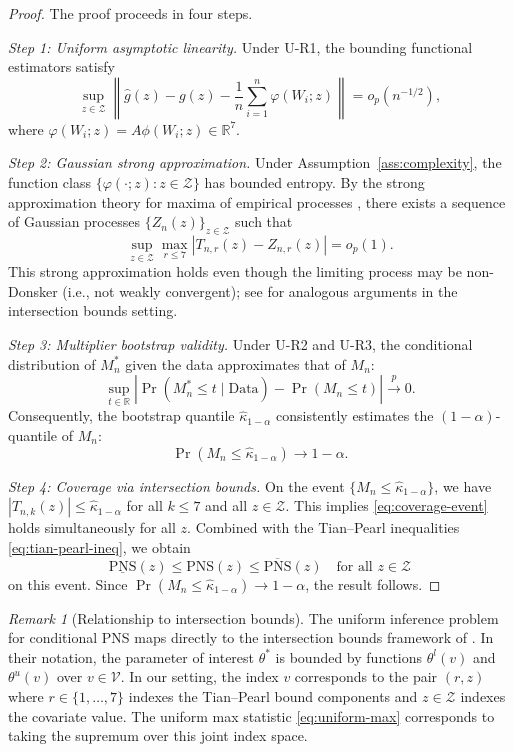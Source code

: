 \documentclass[accepted]{uai2026} %
\theoremstyle{plain}
\theoremstyle{definition}
\theoremstyle{remark}
\newtheorem{remark}[theorem]{Remark}
\begin{document}
\begin{proof}
The proof proceeds in four steps.

\emph{Step 1: Uniform asymptotic linearity.}
Under U-R1, the bounding functional estimators satisfy
\[
  \sup_{z \in \mathcal{Z}} \left\|
    \hat g(z) - g(z) - \frac{1}{n}\sum_{i=1}^n \varphi(W_i;z)
  \right\| = o_p(n^{-1/2}),
\]
where $\varphi(W_i;z) = A\phi(W_i;z) \in \mathbb{R}^7$.

\emph{Step 2: Gaussian strong approximation.}
Under Assumption~\ref{ass:complexity}, the function class
$\{\varphi(\cdot;z) : z \in \mathcal{Z}\}$ has bounded entropy. By the
strong approximation theory for maxima of empirical processes
\citep{chernozhukov2013gaussian}, there exists a sequence of Gaussian
processes $\{Z_n(z)\}_{z \in \mathcal{Z}}$ such that
\[
  \sup_{z \in \mathcal{Z}} \max_{r \le 7}
    \left| T_{n,r}(z) - Z_{n,r}(z) \right| = o_p(1).
\]
This strong approximation holds even though the limiting process may be
non-Donsker (i.e., not weakly convergent); see
\citep{chernozhukov2013intersection} for analogous arguments in the
intersection bounds setting.

\emph{Step 3: Multiplier bootstrap validity.}
Under U-R2 and U-R3, the conditional distribution of $M_n^*$ given the data
approximates that of $M_n$:
\[
  \sup_{t \in \mathbb{R}} \left|
    \Pr(M_n^* \le t \mid \text{Data}) - \Pr(M_n \le t)
  \right| \xrightarrow{p} 0.
\]
Consequently, the bootstrap quantile $\hat\kappa_{1-\alpha}$ consistently
estimates the $(1-\alpha)$-quantile of $M_n$:
\[
  \Pr(M_n \le \hat\kappa_{1-\alpha}) \to 1 - \alpha.
\]

\emph{Step 4: Coverage via intersection bounds.}
On the event $\{M_n \le \hat\kappa_{1-\alpha}\}$, we have
$|T_{n,k}(z)| \le \hat\kappa_{1-\alpha}$ for all $k \le 7$ and all
$z \in \mathcal{Z}$. This implies \eqref{eq:coverage-event} holds
simultaneously for all $z$. Combined with the Tian--Pearl inequalities
\eqref{eq:tian-pearl-ineq}, we obtain
\[
  \underline{\mathrm{PNS}}(z) \le \mathrm{PNS}(z) \le \overline{\mathrm{PNS}}(z)
  \quad \text{for all } z \in \mathcal{Z}
\]
on this event. Since $\Pr(M_n \le \hat\kappa_{1-\alpha}) \to 1 - \alpha$,
the result follows.
\end{proof}

\begin{remark}[Relationship to intersection bounds]
\label{rem:intersection}
The uniform inference problem for conditional PNS maps directly to the
intersection bounds framework of \citep{chernozhukov2013intersection}.
In their notation, the parameter of interest $\theta^*$ is bounded by
functions $\theta^l(v)$ and $\theta^u(v)$ over $v \in \mathcal{V}$.
In our setting, the index $v$ corresponds to the pair $(r, z)$ where
$r \in \{1,\ldots,7\}$ indexes the Tian--Pearl bound components and
$z \in \mathcal{Z}$ indexes the covariate value. The uniform max statistic
\eqref{eq:uniform-max} corresponds to taking the supremum over this
joint index space.
\end{remark}
\end{document}
